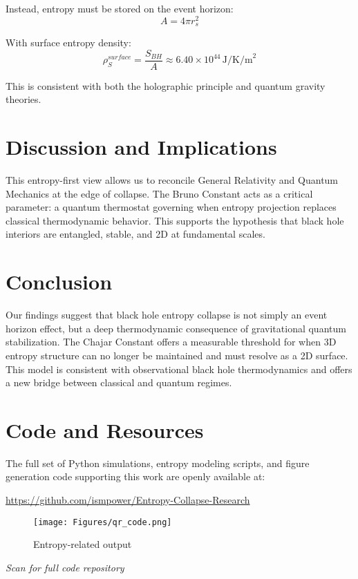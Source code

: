 \documentclass[12pt]{article}
\begin{document}
Instead, entropy must be stored on the event horizon:
\begin{equation}
A = 4\pi r_s^2
\end{equation}

With surface entropy density:
\begin{equation}
\rho_S^{surface} = \frac{S_{BH}}{A} \approx 6.40 \times 10^{44} \, \text{J/K/m}^2
\end{equation}

This is consistent with both the holographic principle and quantum gravity theories.

\section{Discussion and Implications}
This entropy-first view allows us to reconcile General Relativity and Quantum Mechanics at the edge of collapse. The Bruno Constant acts as a critical parameter: a quantum thermostat governing when entropy projection replaces classical thermodynamic behavior. This supports the hypothesis that black hole interiors are entangled, stable, and 2D at fundamental scales.

\section{Conclusion}

Our findings suggest that black hole entropy collapse is not simply an event horizon effect, but a deep thermodynamic consequence of gravitational quantum stabilization. The Chajar Constant offers a measurable threshold for when 3D entropy structure can no longer be maintained and must resolve as a 2D surface. This model is consistent with observational black hole thermodynamics and offers a new bridge between classical and quantum regimes.

\section*{Code and Resources}

The full set of Python simulations, entropy modeling scripts, and figure generation code supporting this work are openly available at:
\begin{center}
\url{https://github.com/ismpower/Entropy-Collapse-Research}
\begin{figure}[H]
\centering
\texttt{[image: Figures/qr\_code.png]}
\caption{Entropy-related output}
\label{fig:Figures_qr_code_png}
\end{figure}

\textit{Scan for full code repository}\

\end{center}
\end{document}
